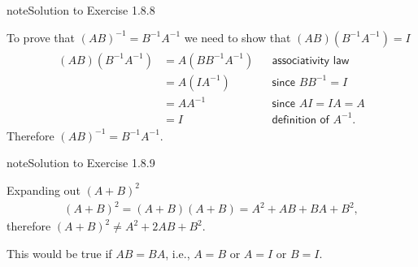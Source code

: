 \documentclass[letterpaper,10pt,english]{jupyterBook}
\begin{document}
\begin{sphinxadmonition}{note}{Solution to Exercise 1.8.8}



\sphinxAtStartPar
To prove that \((AB)^{-1} = B^{-1}A^{-1}\) we need to show that \((AB)(B^{-1}A^{-1}) = I\)
\begin{equation*}
\begin{split} \begin{align*}
    (AB)(B^{-1}A^{-1}) 
    &= A(BB^{-1}A^{-1}) && \textsf{associativity law} \\
    &= A(IA^{-1}) && \textsf{since $BB^{-1} = I$} \\
    &= AA^{-1} && \textsf{since $AI = IA = A$}\\
    &= I    && \textsf{definition of $A^{-1}.$} 
\end{align*} \end{split}
\end{equation*}
\sphinxAtStartPar
Therefore \((AB)^{-1} = B^{-1}A^{-1}\).
\end{sphinxadmonition}
 \label{_pages/A1_Matrices_exercises_solutions:_pages/A1_Matrices_exercises_solutions-solution-8}

\begin{sphinxadmonition}{note}{Solution to Exercise 1.8.9}



\sphinxAtStartPar
Expanding out \((A + B)^2\)
\begin{equation*}
\begin{split} (A + B)^2 = (A + B)(A + B) = A^2 + AB + BA + B^2, \end{split}
\end{equation*}
\sphinxAtStartPar
therefore \((A + B)^2 \neq A^2 + 2AB + B^2\).

\sphinxAtStartPar
This would be true if \(AB = BA\), i.e., \(A = B\) or \(A = I\) or \(B = I\).
\end{sphinxadmonition}
 \label{_pages/A1_Matrices_exercises_solutions:_pages/A1_Matrices_exercises_solutions-solution-9}
\end{document}
